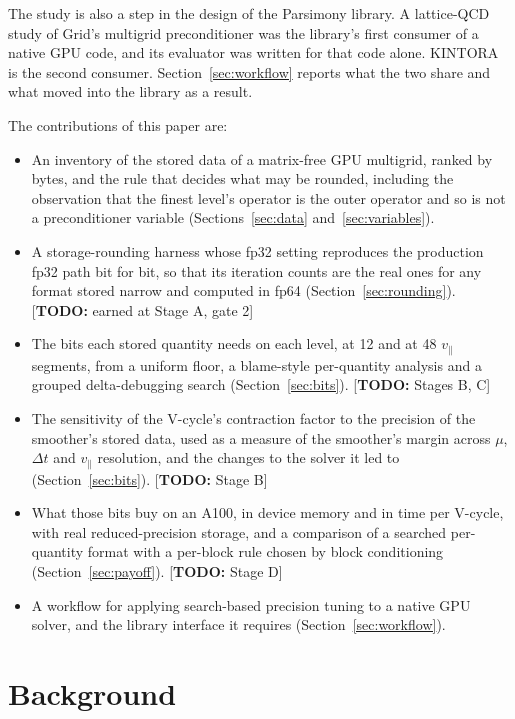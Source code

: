 \documentclass[11pt]{article}
\newcommand{\todo}[1]{\textcolor{red!70!black}{\small[\textbf{TODO:} #1]}}
\newcommand{\vpar}{v_\parallel}
\begin{document}
The study is also a step in the design of the Parsimony library.  A lattice-QCD study of Grid's
multigrid preconditioner was the library's first consumer of a native GPU code, and its
evaluator was written for that code alone.  KINTORA is the second consumer.
Section~\ref{sec:workflow} reports what the two share and what moved into the library as a
result.

The contributions of this paper are:
\begin{itemize}
  \item An inventory of the stored data of a matrix-free GPU multigrid, ranked by bytes, and
    the rule that decides what may be rounded, including the observation that the finest
    level's operator is the outer operator and so is not a preconditioner variable
    (Sections~\ref{sec:data} and~\ref{sec:variables}).
  \item A storage-rounding harness whose fp32 setting reproduces the production fp32 path bit
    for bit, so that its iteration counts are the real ones for any format stored narrow and
    computed in fp64 (Section~\ref{sec:rounding}). \todo{earned at Stage A, gate 2}
  \item The bits each stored quantity needs on each level, at 12 and at 48 $\vpar$ segments,
    from a uniform floor, a blame-style per-quantity analysis and a grouped delta-debugging
    search (Section~\ref{sec:bits}). \todo{Stages B, C}
  \item The sensitivity of the V-cycle's contraction factor to the precision of the smoother's
    stored data, used as a measure of the smoother's margin across $\mu$, $\Delta t$ and $\vpar$
    resolution, and the changes to the solver it led to (Section~\ref{sec:bits}). \todo{Stage B}
  \item What those bits buy on an A100, in device memory and in time per V-cycle, with real
    reduced-precision storage, and a comparison of a searched per-quantity format with a
    per-block rule chosen by block conditioning (Section~\ref{sec:payoff}). \todo{Stage D}
  \item A workflow for applying search-based precision tuning to a native GPU solver, and the
    library interface it requires (Section~\ref{sec:workflow}).
\end{itemize}

\section{Background}
\label{sec:background}
\end{document}
